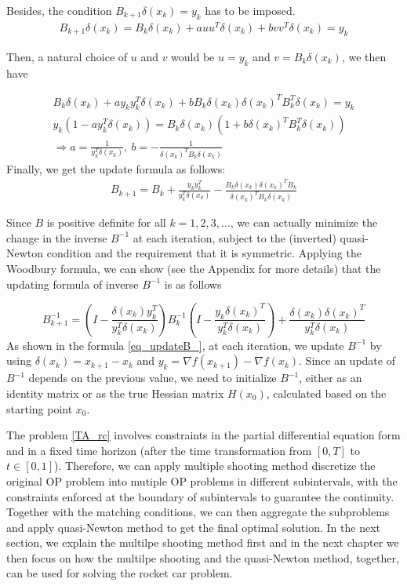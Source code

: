 \documentclass  [
  paper    = a4,
  BCOR     = 10mm,
  twoside,
  fontsize = 12pt,
  fleqn,
  toc      = bibnumbered,
  toc      = listofnumbered,
  numbers  = noendperiod,
  headings = normal,
  listof   = leveldown,
  version  = 3.03
]                                       {scrreprt}
\newcommand{\<}{\langle}
\renewcommand{\>}{\rangle}
\begin{document}
   Besides, the condition $B_{k+1}\delta(x_k) = y_k$ has to be imposed.
   \begin{align*}
   B_{k+1}\delta(x_k) = B_k\delta(x_k)  + a u u^T\delta(x_k) + b v v^T\delta(x_k) = y_k
   \end{align*}
   
   Then, a natural choice of $u$ and $v$ would be $u=y_k$ and $v=B_k\delta(x_k)$, we then have
   
   \begin{align*}
   B_k\delta(x_k) + a y_ky^T_k\delta(x_k) + bB_k\delta(x_k) \delta(x_k)^TB_k^T\delta(x_k) = y_k  \\
   y_k(1-ay_k^T\delta(x_k) ) = B_k\delta(x_k)(1+ b \delta(x_k)^TB_k^T\delta(x_k)) \\
   \Rightarrow a = \frac{1}{y_k^T\delta(x_k)}, \  b= - \frac{1}{\delta(x_k)^TB_k\delta(x_k)}
   \end{align*}
   Finally, we get the update formula as follows: 
   \begin{align*}
   B_{k+1} = B_k +  \frac{y_ky_k^T}{y_k^T\delta(x_k)}  - \frac{B_k\delta(x_k)\delta(x_k)^TB_k}{\delta(x_k)^TB_k\delta(x_k)}
   \end{align*}
   
   Since $B$ is positive definite for all $k = 1,2, 3, ...$, we can actually minimize the change in the inverse $B^{-1}$ at each iteration, subject to the (inverted) quasi-Newton condition and the requirement that it is symmetric. Applying the Woodbury formula, we can show (see the Appendix for more details) that the updating formula of inverse $B^{-1}$ is as follows
   
   \begin{equation}
   B_{k+1}^{-1} = (I - \frac{\delta(x_k)y_k^T}{y_k^T\delta(x_k)})B_k^{-1}(I - \frac{y_k\delta(x_k)^T}{y_k^T\delta(x_k)}) +  \frac{\delta(x_k)\delta(x_k)^T}{y_k^T\delta(x_k)} 
   \label{eq_updateB_}
   \end{equation}
   As shown in the formula \ref{eq_updateB_}, at each iteration, we update $B^{-1}$ by using  $\delta(x_k) = x_{k+1} -x_k$ and $y_k = \nabla f(x_{k+1}) - \nabla f(x_k)$. Since an update of $B^{-1}$ depends on the previous value, we need to initialize $B^{-1}$, either as an identity matrix or as the true Hessian matrix $H(x_0)$, calculated based on the starting point $x_0$.
   
   The problem \ref{TA_rc} involves constraints in the partial differential equation form and in a fixed time horizon (after the time transformation from $[0, T]$ to $t \in [0, 1]$). Therefore, we can apply multiple shooting method discretize the original OP problem into mutiple OP problems in different subintervals, with the constraints enforced at the boundary of subintervals to guarantee the continuity. Together with the matching conditions, we can then aggregate the subproblems and apply quasi-Newton method to get the final optimal solution. In the next section, we explain the multilpe shooting method first and in the next chapter we then focus on how the multilpe shooting and the quasi-Newton method, together, can be used for solving the rocket car problem.  
   
\end{document}
